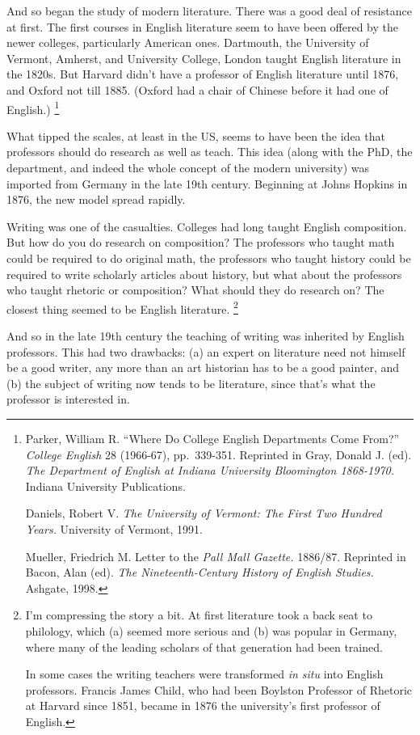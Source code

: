 \documentclass[12pt]{book}
\begin{document}
And so began the study of modern literature. There was a good deal of
resistance at first. The first courses in English literature seem to
have been offered by the newer colleges, particularly American ones.
Dartmouth, the University of Vermont, Amherst, and University College,
London taught English literature in the 1820s. But Harvard didn't have a
professor of English literature until 1876, and Oxford not till 1885.
(Oxford had a chair of Chinese before it had one of English.) \footnote{Parker, William R. ``Where Do College English Departments Come
From?'' \emph{College English} 28 (1966-67), pp.~339-351. Reprinted in
Gray, Donald J. (ed). \emph{The Department of English at Indiana
University Bloomington 1868-1970.} Indiana University Publications.

Daniels, Robert V. \emph{The University of Vermont: The First Two
Hundred Years.} University of Vermont, 1991.

Mueller, Friedrich M. Letter to the \emph{Pall Mall Gazette.} 1886/87.
Reprinted in Bacon, Alan (ed). \emph{The Nineteenth-Century History of
English Studies.} Ashgate, 1998.}

What tipped the scales, at least in the US, seems to have been the idea
that professors should do research as well as teach. This idea (along
with the PhD, the department, and indeed the whole concept of the modern
university) was imported from Germany in the late 19th century.
Beginning at Johns Hopkins in 1876, the new model spread rapidly.

Writing was one of the casualties. Colleges had long taught English
composition. But how do you do research on composition? The professors
who taught math could be required to do original math, the professors
who taught history could be required to write scholarly articles about
history, but what about the professors who taught rhetoric or
composition? What should they do research on? The closest thing seemed
to be English literature. \footnote{I'm compressing the story a bit. At first literature took a back
seat to philology, which (a) seemed more serious and (b) was popular in
Germany, where many of the leading scholars of that generation had been
trained.

In some cases the writing teachers were transformed \emph{in situ} into
English professors. Francis James Child, who had been Boylston Professor
of Rhetoric at Harvard since 1851, became in 1876 the university's first
professor of English.}

And so in the late 19th century the teaching of writing was inherited by
English professors. This had two drawbacks: (a) an expert on literature
need not himself be a good writer, any more than an art historian has to
be a good painter, and (b) the subject of writing now tends to be
literature, since that's what the professor is interested in.
\end{document}
